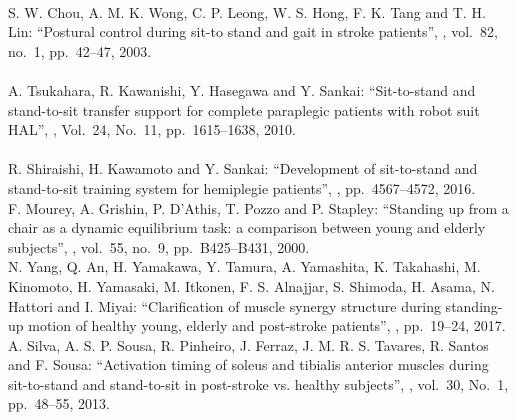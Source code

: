 \begin{mythebibliography}{99}
\leavevmode \\
S. W. Chou, A. M. K. Wong, C. P. Leong, W. S. Hong, F. K. Tang and T. H. Lin:
\newblock ``Postural control during sit-to stand and gait in stroke patients'',
, vol.~82, no.~1, pp.~42--47, 2003.
\\

\leavevmode \\
A. Tsukahara, R. Kawanishi, Y. Hasegawa and Y. Sankai:
\newblock ``Sit-to-stand and stand-to-sit transfer support for complete paraplegic patients with robot suit HAL'',
, Vol.~24, No.~11, pp.~1615--1638, 2010. 
\\

\leavevmode \\
R. Shiraishi, H. Kawamoto and Y. Sankai:
\newblock ``Development of sit-to-stand and stand-to-sit training system for hemiplegie patients'',
, pp.~4567--4572, 2016. 
\\

F. Mourey, A. Grishin, P. D'Athis, T. Pozzo and P. Stapley:
\newblock ``Standing up from a chair as a dynamic equilibrium task: a comparison between young and elderly subjects'',
, vol.~55, no.~9, pp.~B425--B431, 2000.
\\

N. Yang, Q. An, H. Yamakawa, Y. Tamura, A. Yamashita, K. Takahashi, M. Kinomoto, H. Yamasaki, M. Itkonen, F. S. Alnajjar, S. Shimoda, H. Asama, N. Hattori and I. Miyai:
\newblock ``Clarification of muscle synergy structure during standing-up motion of healthy young, elderly and post-stroke patients'',
, pp.~19--24, 2017.
\\

A. Silva, A. S. P. Sousa, R. Pinheiro, J. Ferraz, J. M. R. S. Tavares, R. Santos and F. Sousa:
\newblock ``Activation timing of soleus and tibialis anterior muscles during sit-to-stand and stand-to-sit in post-stroke vs. healthy subjects'',
, vol.~30, No.~1,  pp.~48--55, 2013.
\\


\end{mythebibliography}
